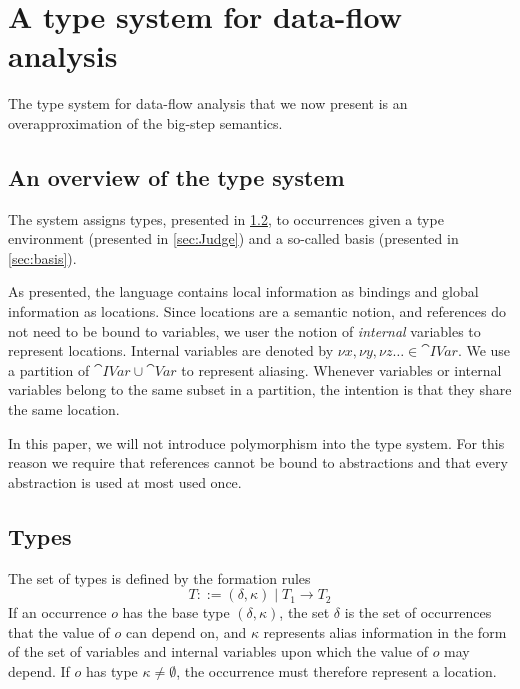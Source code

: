 \documentclass{eptcs}
\begin{document}
\begin{landscape}

\end{landscape}
\fi

\section{A type system for data-flow analysis}\label{sec:TypeSys}

The type system for data-flow analysis that we now present is an
overapproximation of the big-step semantics.

\subsection{An overview of the type system}

The system assigns types, presented in \cref{sec:types}, to
occurrences given a type environment (presented in
\cref{sec:Judge}) and a so-called basis (presented in
\cref{sec:basis}).

As presented, the language contains local information as bindings and
global information as locations.  Since locations are a semantic
notion, and references do not need to be bound to variables, we user
the notion of \emph{internal} variables to represent locations.
Internal variables are denoted by
$\nu x,\nu y, \nu z \ldots \in\cat{IVar}$.  We use a partition of
$\cat{IVar} \cup \cat{Var}$ to represent aliasing.  Whenever variables
or internal variables belong to the same subset in a partition, the
intention is that they share the same location.

In this paper, we will not introduce polymorphism into the type
system.  For this reason we require that references cannot be bound to
abstractions and that every abstraction is used at most used once.

\subsection{Types}\label{sec:types}

The set of types  is defined by the formation rules
%
\[ T ::=(\delta,\kappa)\mid T_1 \rightarrow T_2 \]
%
If an occurrence $o$ has the base type $(\delta,\kappa)$, the set
$\delta$ is the set of occurrences that the value of $o$ can depend
on, and $\kappa$ represents alias information in the form of the set
of variables and internal variables upon which the value of $o$ may
depend.  If $o$ has type $\kappa \neq \emptyset$, the
occurrence must therefore represent a location.
\end{document}
